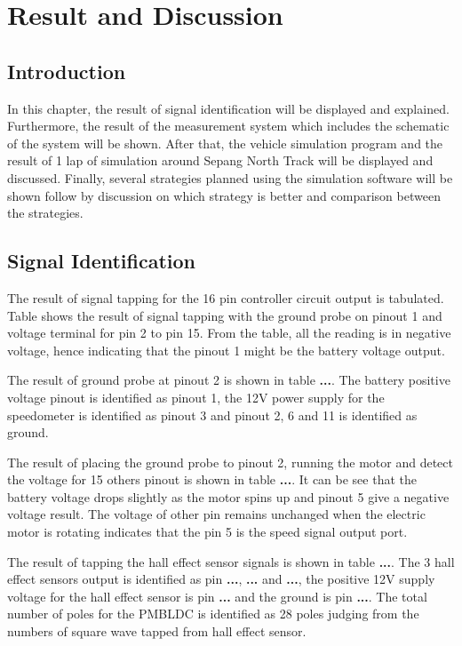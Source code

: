 \chapter{Result and Discussion}

\section{Introduction}
In this chapter, the result of signal identification will be displayed and explained. Furthermore, the result of the measurement system which includes the schematic of the system will be shown. After that, the vehicle simulation program and the result of 1 lap of simulation around Sepang North Track will be displayed and discussed. Finally, several strategies planned using the simulation software will be shown follow by discussion on which strategy is better and comparison between the strategies.

\section{Signal Identification}

The result of signal tapping for the 16 pin controller circuit output is tabulated. Table \textbf{} shows the result of signal tapping with the ground probe on pinout 1 and voltage terminal for pin 2 to pin 15. From the table, all the reading is in negative voltage, hence indicating that the pinout 1 might be the battery voltage output.

The result of ground probe at pinout 2 is shown in table \textbf{...}. The battery positive voltage pinout is identified as pinout 1, the 12V power supply for the speedometer is identified as pinout 3 and pinout 2, 6 and 11 is identified as ground. 

The result of placing the ground probe to pinout 2, running the motor and detect the voltage for 15 others pinout is shown in table \textbf{...}. It can be see that the battery voltage drops slightly as the motor spins up and pinout 5 give a negative voltage result. The voltage of other pin remains unchanged when the electric motor is rotating indicates that the pin 5 is the speed signal output port.

The result of tapping the hall effect sensor signals is shown in table \textbf{...}. The 3 hall effect sensors output is identified as pin \textbf{...}, \textbf{...} and \textbf{...}, the positive 12V supply voltage for the hall effect sensor is pin \textbf{...} and the ground is pin \textbf{...}. The total number of poles for the PMBLDC is identified as 28 poles judging from the numbers of square wave tapped from hall effect sensor.

